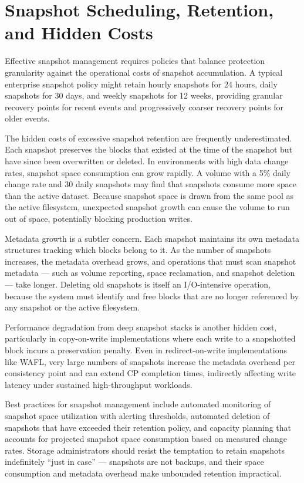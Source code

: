 \section{Snapshot Scheduling, Retention, and Hidden Costs}

Effective snapshot management requires policies that balance protection granularity against the operational costs of snapshot accumulation. A typical enterprise snapshot policy might retain hourly snapshots for 24 hours, daily snapshots for 30 days, and weekly snapshots for 12 weeks, providing granular recovery points for recent events and progressively coarser recovery points for older events.

The hidden costs of excessive snapshot retention are frequently underestimated. Each snapshot preserves the blocks that existed at the time of the snapshot but have since been overwritten or deleted. In environments with high data change rates, snapshot space consumption can grow rapidly. A volume with a 5\% daily change rate and 30 daily snapshots may find that snapshots consume more space than the active dataset. Because snapshot space is drawn from the same pool as the active filesystem, unexpected snapshot growth can cause the volume to run out of space, potentially blocking production writes.

Metadata growth is a subtler concern. Each snapshot maintains its own metadata structures tracking which blocks belong to it. As the number of snapshots increases, the metadata overhead grows, and operations that must scan snapshot metadata --- such as volume reporting, space reclamation, and snapshot deletion --- take longer. Deleting old snapshots is itself an I/O-intensive operation, because the system must identify and free blocks that are no longer referenced by any snapshot or the active filesystem.

Performance degradation from deep snapshot stacks is another hidden cost, particularly in copy-on-write implementations where each write to a snapshotted block incurs a preservation penalty. Even in redirect-on-write implementations like WAFL, very large numbers of snapshots increase the metadata overhead per consistency point and can extend CP completion times, indirectly affecting write latency under sustained high-throughput workloads.

Best practices for snapshot management include automated monitoring of snapshot space utilization with alerting thresholds, automated deletion of snapshots that have exceeded their retention policy, and capacity planning that accounts for projected snapshot space consumption based on measured change rates. Storage administrators should resist the temptation to retain snapshots indefinitely ``just in case'' --- snapshots are not backups, and their space consumption and metadata overhead make unbounded retention impractical.

